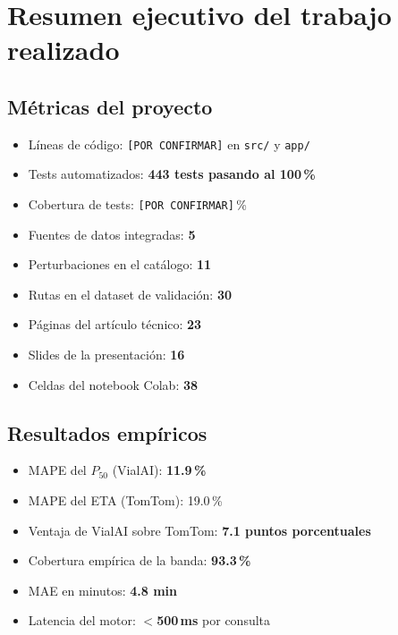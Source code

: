 \documentclass[11pt,a4paper]{article}
\begin{document}
\section{Resumen ejecutivo del trabajo realizado}

\subsection{Métricas del proyecto}
\begin{itemize}
  \item Líneas de código: \texttt{[POR CONFIRMAR]} en \texttt{src/} y \texttt{app/}
  \item Tests automatizados: \textbf{443 tests pasando al 100\,\%}
  \item Cobertura de tests: \texttt{[POR CONFIRMAR]}\,\%
  \item Fuentes de datos integradas: \textbf{5}
  \item Perturbaciones en el catálogo: \textbf{11}
  \item Rutas en el dataset de validación: \textbf{30}
  \item Páginas del artículo técnico: \textbf{23}
  \item Slides de la presentación: \textbf{16}
  \item Celdas del notebook Colab: \textbf{38}
\end{itemize}

\subsection{Resultados empíricos}
\begin{itemize}
  \item MAPE del $P_{50}$ (VialAI): \textbf{11.9\,\%}
  \item MAPE del ETA (TomTom): 19.0\,\%
  \item Ventaja de VialAI sobre TomTom: \textbf{7.1 puntos porcentuales}
  \item Cobertura empírica de la banda: \textbf{93.3\,\%}
  \item MAE en minutos: \textbf{4.8 min}
  \item Latencia del motor: \textbf{$<$500\,ms} por consulta
\end{itemize}
\end{document}
